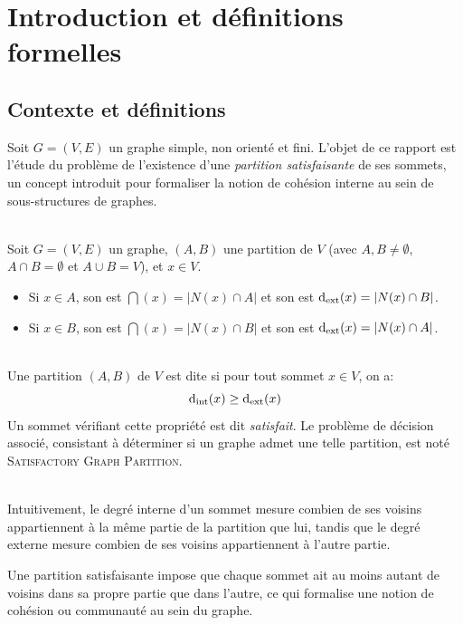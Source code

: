 \section{Introduction et définitions formelles}\label{sec:intro}

\subsection{Contexte et définitions}
Soit \(G = (V, E)\) un graphe simple, non orienté et fini.
L'objet de ce rapport est l'étude du problème de l'existence d'une \textit{partition satisfaisante} de ses sommets, un concept introduit pour formaliser la notion de cohésion interne au sein de sous-structures de graphes.

\begin{definition}\,\\
    Soit \(G = (V, E)\) un graphe, \((A, B)\) une partition de \(V\) (avec \(A, B \neq \emptyset\), \(A \cap B = \emptyset\) et \(A \cup B = V\)), et \(x \in V\).
    \begin{itemize}
        \item Si \(x \in A\), son  est \(\dint(x) = |N(x) \cap A|\) et son  est \(\operatorname{d_{\mathrm{ext}}}(x) = |N(x) \cap B|\).
        \item Si \(x \in B\), son  est \(\dint(x) = |N(x) \cap B|\) et son  est \(\operatorname{d_{\mathrm{ext}}}(x) = |N(x) \cap A|\).
    \end{itemize}
\end{definition}

\begin{definition}\,\\
    Une partition \((A, B)\) de \(V\) est dite  si pour tout sommet \(x \in V\), on a:
    \begin{equation*}
        \operatorname{d_{\mathrm{int}}}(x) \geq \operatorname{d_{\mathrm{ext}}}(x)
    \end{equation*}
    Un sommet vérifiant cette propriété est dit \textit{satisfait}. 
    Le problème de décision associé, consistant à déterminer si un graphe admet une telle partition, est noté \textsc{Satisfactory Graph Partition}.
\end{definition}

\begin{remark}\,\\
    Intuitivement, le degré interne d'un sommet mesure combien de ses voisins appartiennent à la même partie de la partition que lui, tandis que le degré externe mesure combien de ses voisins appartiennent à l'autre partie.
    
    Une partition satisfaisante impose que chaque sommet ait au moins autant de voisins dans sa propre partie que dans l'autre, ce qui formalise une notion de \og{}cohésion\fg{} ou \og{}communauté\fg{} au sein du graphe.
\end{remark}

